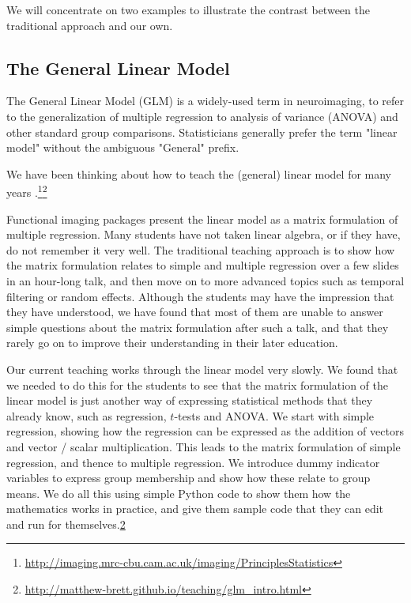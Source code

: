 We will concentrate on two examples to illustrate the contrast between the
traditional approach and our own.

\subsection{The General Linear Model}

The General Linear Model (GLM) is a widely-used term in neuroimaging, to refer
to the generalization of multiple regression to analysis of variance (ANOVA)
and other standard group comparisons.  Statisticians generally prefer the term
"linear model" without the ambiguous "General" prefix.

We have been thinking about how to teach the (general) linear model for many
years
\citep{poline2012general}.\footnote{\url{http://imaging.mrc-cbu.cam.ac.uk/imaging/PrinciplesStatistics}}\footnote{\label{glm_intro}
\url{http://matthew-brett.github.io/teaching/glm_intro.html}}

Functional imaging packages present the linear model as a matrix formulation
of multiple regression.  Many students have not taken linear algebra, or if
they have, do not remember it very well.  The traditional teaching approach is
to show how the matrix formulation relates to simple and multiple regression
over a few slides in an hour-long talk, and then move on to more advanced
topics such as temporal filtering or random effects.  Although the students
may have the impression that they have understood, we have found that most of
them are unable to answer simple questions about the matrix formulation after
such a talk, and that they rarely go on to improve their understanding in
their later education.

Our current teaching works through the linear model very slowly. We found that
we needed to do this for the students to see that the matrix formulation of
the linear model is just another way of expressing statistical methods that
they already know, such as regression, $t$-tests and ANOVA.  We start with
simple regression, showing how the regression can be expressed as the addition
of vectors and vector / scalar multiplication.  This leads to the matrix
formulation of simple regression, and thence to multiple regression.  We
introduce dummy indicator variables to express group membership and show how
these relate to group means.  We do all this using simple Python code to show
them how the mathematics works in practice, and give them sample code that
they can edit and run for themselves.\cref{glm_intro}


